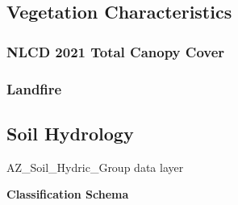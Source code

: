 \documentclass[
]{agujournal2019}
\begin{document}
\subsection{Vegetation
Characteristics}\label{vegetation-characteristics}

\subsubsection{NLCD 2021 Total Canopy
Cover}\label{nlcd-2021-total-canopy-cover}

\subsubsection{Landfire}\label{landfire}

\subsection{Soil Hydrology}\label{soil-hydrology}

AZ\_Soil\_Hydric\_Group data layer

\textbf{Classification Schema}
\end{document}
